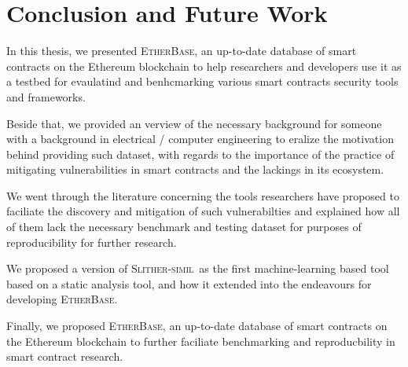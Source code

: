 \documentclass[letterpaper,12pt,onecolumn,final]{report}
\newcommand{\etherbase}{{\scshape EtherBase\xspace}}
\newcommand{\slithersimil}{{\scshape Slither-simil\xspace}}
\begin{document}








%


\chapter{Conclusion and Future Work}
\label{chap:conclusion}

In this thesis, we presented \etherbase, an up-to-date database of smart contracts on the Ethereum blockchain to help researchers and developers use it as a testbed for evaulatind and benhcmarking various smart contracts security tools and frameworks.

Beside that, we provided an verview of the necessary background for someone with a background in electrical / computer engineering to eralize the motivation behind providing such dataset, with regards to the importance of the practice of mitigating vulnerabilities in smart contracts and the lackings in its ecosystem.

We went through the literature concerning the tools researchers have proposed to faciliate the discovery and mitigation of such vulnerabilties and explained how all of them lack the necessary benchmark and testing dataset for purposes of reproducibility for further research.

We proposed a version of \slithersimil~as the first machine-learning based tool based on a static analysis tool, and how it extended into the endeavours for developing \etherbase.

Finally, we proposed \etherbase, an up-to-date database of smart contracts on the Ethereum blockchain to further faciliate benchmarking and reproducbility in smart contract research.

\clearpage
{}
{}  %
\singlespacing %





\appendix
\setcounter{table}{0}		%
\setcounter{figure}{0}		%
\renewcommand{\thefigure}{\Alph{chapter}.\arabic{figure}} 	%
\renewcommand{\thetable}{\Alph{chapter}.\arabic{table}}		%
\end{document}
